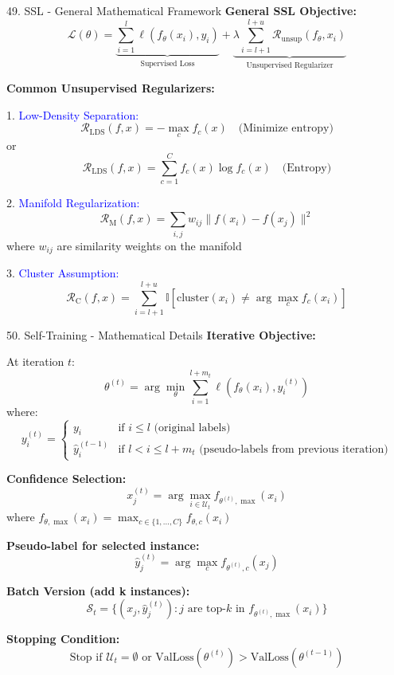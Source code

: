 \documentclass[8pt]{beamer}
\begin{document}
	\begin{frame}{49. SSL - General Mathematical Framework}
		\fontsize{6.5}{7.5}\selectfont
		\textbf{General SSL Objective:}
		\[
		\mathcal{L}(\theta) = \underbrace{\sum_{i=1}^l \ell(f_\theta(x_i), y_i)}_{\text{Supervised Loss}} + \underbrace{\lambda \sum_{i=l+1}^{l+u} \mathcal{R}_\text{unsup}(f_\theta, x_i)}_{\text{Unsupervised Regularizer}}
		\]
		
		\textbf{Common Unsupervised Regularizers:}
		
		1. \textcolor{blue}{Low-Density Separation:}
		\[
		\mathcal{R}_{\text{LDS}}(f, x) = -\max_c f_c(x) \quad \text{(Minimize entropy)}
		\]
		or
		\[
		\mathcal{R}_{\text{LDS}}(f, x) = \sum_{c=1}^C f_c(x) \log f_c(x) \quad \text{(Entropy)}
		\]
		
		2. \textcolor{blue}{Manifold Regularization:}
		\[
		\mathcal{R}_{\text{M}}(f, x) = \sum_{i,j} w_{ij} \|f(x_i) - f(x_j)\|^2
		\]
		where $w_{ij}$ are similarity weights on the manifold
		
		3. \textcolor{blue}{Cluster Assumption:}
		\[
		\mathcal{R}_{\text{C}}(f, x) = \sum_{i=l+1}^{l+u} \mathbb{I}[\text{cluster}(x_i) \neq \arg\max_c f_c(x_i)]
		\]
	\end{frame}
	
	\begin{frame}{50. Self-Training - Mathematical Details}
		\fontsize{6.5}{7.5}\selectfont
		\textbf{Iterative Objective:}
		
		At iteration $t$:
		\[
		\theta^{(t)} = \arg\min_\theta \sum_{i=1}^{l + m_t} \ell(f_\theta(x_i), y_i^{(t)})
		\]
		where:
		\[
		y_i^{(t)} = 
		\begin{cases}
			y_i & \text{if } i \leq l \text{ (original labels)} \\
			\hat{y}_i^{(t-1)} & \text{if } l < i \leq l + m_t \text{ (pseudo-labels from previous iteration)}
		\end{cases}
		\]
		
		\textbf{Confidence Selection:}
		\[
		x_{j}^{(t)} = \arg\max_{i \in \mathcal{U}_t} f_{\theta^{(t)},\max}(x_i)
		\]
		where $f_{\theta,\max}(x_i) = \max_{c \in \{1,...,C\}} f_{\theta,c}(x_i)$
		
		\textbf{Pseudo-label for selected instance:}
		\[
		\hat{y}_j^{(t)} = \arg\max_c f_{\theta^{(t)},c}(x_j)
		\]
		
		\textbf{Batch Version (add k instances):}
		\[
		\mathcal{S}_t = \{(x_j, \hat{y}_j^{(t)}) : j \text{ are top-}k \text{ in } f_{\theta^{(t)},\max}(x_i)\}
		\]
		
		\textbf{Stopping Condition:}
		\[
		\text{Stop if } \mathcal{U}_t = \emptyset \text{ or } \text{ValLoss}(\theta^{(t)}) > \text{ValLoss}(\theta^{(t-1)})
		\]
	\end{frame}
	
\end{document}

